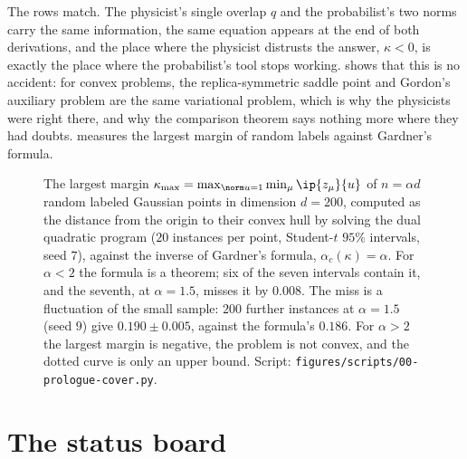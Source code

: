 \begin{refsection}
The rows match. The physicist's single overlap $q$ and the probabilist's two norms carry the same information, the same equation appears at the end of both derivations, and the place where the physicist distrusts the answer, $\kappa<0$, is exactly the place where the probabilist's tool stops working.  shows that this is no accident: for convex problems, the replica-symmetric saddle point and Gordon's auxiliary problem are the same variational problem, which is why the physicists were right there, and why the comparison theorem says nothing more where they had doubts.  measures the largest margin of random labels against Gardner's formula.

\begin{figure}[t]
\centering
{}
\caption{The largest margin $\kappa_{\max}=\max_{\norm u=1}\min_\mu\ip{z_\mu}{u}$ of $n=\alpha d$ random labeled Gaussian points in dimension $d=200$, computed as the distance from the origin to their convex hull by solving the dual quadratic program ($20$ instances per point, Student-$t$ $95\%$ intervals, seed $7$), against the inverse of Gardner's formula, $\alpha_c(\kappa)=\alpha$. For $\alpha<2$ the formula is a theorem; six of the seven intervals contain it, and the seventh, at $\alpha=1.5$, misses it by $0.008$. The miss is a fluctuation of the small sample: $200$ further instances at $\alpha=1.5$ (seed $9$) give $0.190\pm0.005$, against the formula's $0.186$. For $\alpha>2$ the largest margin is negative, the problem is not convex, and the dotted curve is only an upper bound. Script: \texttt{figures/scripts/00-prologue-cover.py}.}\label{fig:prologue:margin}
\end{figure}

\section*{The status board}


\end{refsection}
